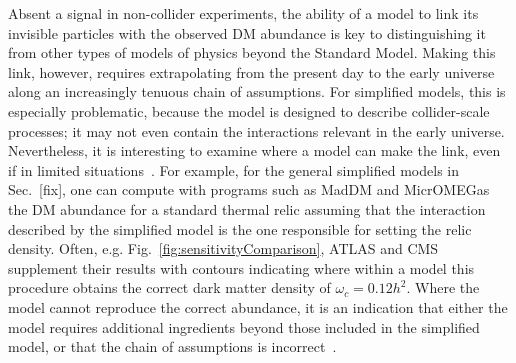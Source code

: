 
Absent a signal in non-collider experiments, the ability of a model to link its invisible particles with the observed DM abundance is key to distinguishing it from other types of models of physics beyond the Standard Model.
Making this link, however, requires extrapolating from the present day to the early universe along an increasingly tenuous chain of assumptions.
For simplified models, this is especially problematic, because the model is designed to describe collider-scale processes; it may not even contain the interactions relevant in the early universe.
Nevertheless, it is interesting to examine where a model can make the link, even if in limited situations~\cite{Busoni:2014gta,Catena:2017xqq}.
For example, for the general simplified models in Sec.~[fix], one can compute with programs such as MadDM and MicrOMEGas~\cite{Backovic:2015cra,Barducci:2016pcb} the DM abundance for a standard thermal relic assuming that the interaction described by the simplified model is the one responsible for setting the relic density.
Often, e.g. Fig.~\ref{fig:sensitivityComparison}, ATLAS and CMS supplement their results with contours indicating where within a model this procedure obtains the correct dark matter density of $\omega_c = 0.12 h^2$.
Where the model cannot reproduce the correct abundance, it is an indication that either the model requires additional ingredients beyond those included in the simplified model, or that the chain of assumptions is incorrect~\cite{Bernal:2017kxu}.








